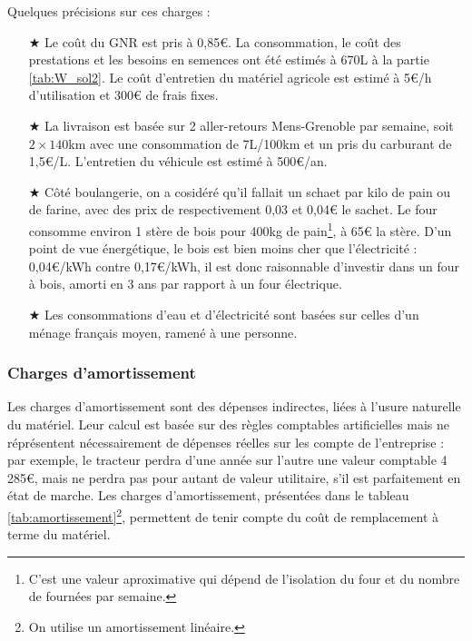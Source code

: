 \documentclass{book}
\begin{document}
Quelques précisions sur ces charges :
\begin{itemize}

	\item[$\bigstar$] Le coût du GNR est pris à 0,85\euro{}. La consommation, le coût des prestations et les besoins en semences ont été estimés à 670L à la partie \ref{tab:W_sol2}. Le coût d'entretien du matériel agricole est estimé à 5\euro{}/h d'utilisation et 300\euro{} de frais fixes.
	\item[$\bigstar$] La livraison est basée sur 2 aller-retours Mens-Grenoble par semaine, soit $2\times140$km avec une consommation de 7L/100km et un pris du carburant de 1,5\euro{}/L. L'entretien du véhicule est estimé à 500\euro{}/an.
	\item[$\bigstar$] Côté boulangerie, on a cosidéré qu'il fallait un schaet par kilo de pain ou de farine, avec des prix de respectivement 0,03 et 0,04\euro{} le sachet. Le four consomme environ 1 stère de bois pour 400kg de pain\footnote{C'est une valeur aproximative qui dépend de l'isolation du four et du nombre de fournées par semaine.}, à 65\euro{} la stère. D'un point de vue énergétique, le bois est bien moins cher que l'électricité : 0,04\euro{}/kWh contre 0,17\euro{}/kWh, il est donc raisonnable d'investir dans un four à bois, amorti en 3 ans par rapport à un four électrique.
	\item[$\bigstar$] Les consommations d'eau et d'électricité sont basées sur celles d'un ménage français moyen, ramené à une personne. 
\end{itemize}

\subsubsection{Charges d'amortissement}

Les charges d'amortissement sont des dépenses indirectes, liées à l'usure naturelle du matériel. Leur calcul est basée sur des règles comptables artificielles mais ne réprésentent nécessairement de dépenses réelles sur les compte de l'entreprise : par exemple, le tracteur perdra d'une année sur l'autre une valeur comptable 4 285\euro{}, mais ne perdra pas pour autant de valeur utilitaire, s'il est parfaitement en état de marche. Les charges d'amortissement, présentées dans le tableau \ref{tab:amortissement}\footnote{On utilise un amortissement linéaire.}, permettent de tenir compte du coût de remplacement à terme du matériel.  
\end{document}
